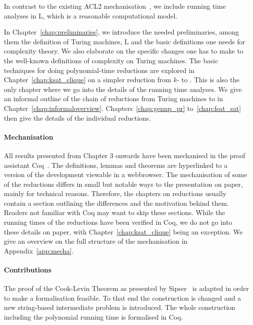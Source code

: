 In contrast to the existing ACL2 mechanisation~\cite{gamboa:cook}, we include running time analyses in L, which is a reasonable computational model.

In Chapter~\ref{chap:preliminaries}, we introduce the needed preliminaries, among them the definition of Turing machines, L and the basic definitions one needs for complexity theory. We also elaborate on the specific changes one has to make to the well-known definitions of complexity on Turing machines.
The basic techniques for doing polynomial-time reductions are explored in Chapter~\ref{chap:ksat_clique} on a simpler reduction from $k$-\SAT{} to \Clique{}. This is also the only chapter where we go into the details of the running time analyses.
We give an informal outline of the chain of reductions from Turing machines to \SAT{} in Chapter~\ref{chap:informaloverview}. 
Chapters~\ref{chap:gennp_pr} to~\ref{chap:fsat_sat} then give the details of the individual reductions.

\paragraph{Mechanisation}
All results presented from Chapter 3 onwards have been mechanised in the proof assistant Coq~\cite{coqweb}. The definitions, lemmas and theorems are hyperlinked to a version of the development viewable in a webbrowser.
The mechanisation of some of the reductions differs in small but notable ways to the presentation on paper, mainly for technical reasons. 
Therefore, the chapters on reductions usually contain a section outlining the differences and the motivation behind them. 
Readers not familiar with Coq may want to skip these sections.
While the running times of the reductions have been verified in Coq, we do not go into these details on paper, with Chapter~\ref{chap:ksat_clique} being an exception.
We give an overview on the full structure of the mechanisation in Appendix~\ref{app:mecha}.

\paragraph{Contributions}
The proof of the Cook-Levin Theorem as presented by Sipser~\cite{Sipser:TheoryofComputation} is adapted in order to make a formalisation feasible. To that end the construction is changed and a new string-based intermediate problem is introduced. 
The whole construction including the polynomial running time is formalised in Coq.





